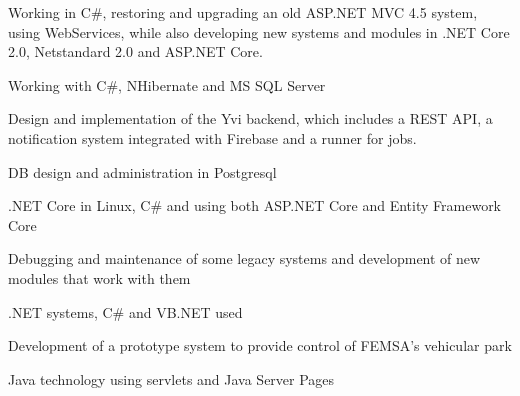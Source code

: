 \documentclass[]{plushcv}
\begin{document}
\begin{minipage}[t]{0.70\textwidth}
    \begin{tightemize}
        \sectionsep
        \item Working in C\#, restoring and upgrading an old ASP.NET MVC 4.5 system, using WebServices, while also developing new systems and modules in .NET Core 2.0, Netstandard 2.0 and ASP.NET Core.
        \item Working with C\#, NHibernate and MS SQL Server
    \end{tightemize}
    \sectionsep

    \begin{tightemize}
        \sectionsep
        \item Design and implementation of the Yvi backend, which includes a REST API, a notification system integrated with Firebase and a runner for jobs.
        \item DB design and administration in Postgresql
        \item .NET Core in Linux, C\# and using both ASP.NET Core and Entity Framework Core
    \end{tightemize}
    \sectionsep

    \begin{tightemize}
        \sectionsep
        \item Debugging and maintenance of some legacy systems and development of new modules that work with them
        \item .NET systems, C\# and VB.NET used
    \end{tightemize}
    \sectionsep

    \begin{tightemize}
        \sectionsep
        \item Development of a prototype system to provide control of FEMSA’s vehicular park
        \item Java technology using servlets and Java Server Pages
    \end{tightemize}
    \sectionsep

\end{minipage}
\hfill
\end{document}
